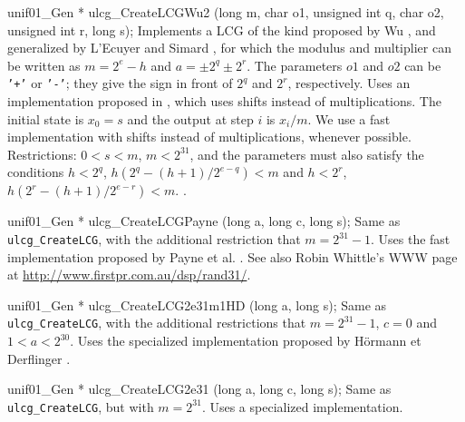 unif01_Gen * ulcg_CreateLCGWu2 (long m, char o1, unsigned int q, char o2,
                                unsigned int r, long s);
\endcode
  \tab  Implements a LCG of the kind proposed by Wu \cite{rWU97a},
   and generalized by L'Ecuyer and Simard \cite{rLEC99e}, for which
   the modulus and multiplier can be written as
   $m = 2^e -h$ and $a = \pm 2^q \pm 2^r$.
%
   The parameters $o1$ and $o2$ can be {\tt '+'} or {\tt '-'};
   they give the sign in front of $2^q$ and $2^r$, respectively.
   Uses an implementation proposed in \cite{rLEC99e,rWU97a},
   which uses shifts instead of multiplications.
   The initial state is $x_0 = s$ and the output at step $i$ is $x_i/m$.
   We use a fast implementation with shifts instead of multiplications,
   whenever possible.
   Restrictions: $0 < s < m$, $m < 2^{31}$,
   and the parameters must also satisfy the conditions $h < 2^q$,
   $h(2^q - (h+1)/{2^{e-q}}) < m$ and  $h < 2^r$,
     $h(2^r - (h+1)/{2^{e-r}}) < m$.
 .
 \endtab
\code


unif01_Gen * ulcg_CreateLCGPayne (long a, long c, long s);
\endcode
  \tab  Same as {\tt ulcg\_CreateLCG}, with the additional restriction that
   $m=2^{31}-1$.
%
   Uses the fast implementation proposed by Payne et al. \cite{rPAY69a,rCAR90a}.
 See also Robin Whittle's WWW page at \url{http://www.firstpr.com.au/dsp/rand31/}.
  \endtab
\code


unif01_Gen * ulcg_CreateLCG2e31m1HD (long a, long s);
\endcode
  \tab  Same as {\tt ulcg\_CreateLCG}, with the additional restrictions that
   $m=2^{31}-1$, $c=0$ and $1< a < 2^{30}$.
%
   Uses the specialized implementation proposed
   by H\"ormann et Derflinger \cite{rHOR93a}.
  \endtab
\code


unif01_Gen * ulcg_CreateLCG2e31 (long a, long c, long s);
\endcode
  \tab  Same as {\tt ulcg\_CreateLCG}, but with
   $m=2^{31}$.  Uses a specialized implementation.
  \endtab
\code


